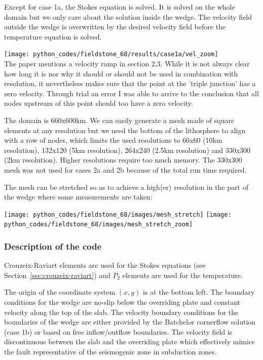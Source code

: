 Except for case 1a, the Stokes equation is solved. It is solved on the whole domain 
but we only care about the solution inside the wedge. The velocity field outside the wedge 
is overwritten by the desired velocity field before the temperature equation is solved.


\begin{center}
\texttt{[image: python\_codes/fieldstone\_68/results/case1a/vel\_zoom]}\\
{\captionfont The paper mentions a velocity ramp in section 2.3. While it is not 
always clear how long it is nor why it should or should not be used in combination
with resolution, it nevertheless makes sure that the point at the 'triple junction'
has a zero velocity. Through trial an error I was able to arrive to the conclusion that 
all nodes upstream of this point should too have a zero velocity.} 
\end{center}

The domain is 660x600km. We can easily generate a mesh made of square elements at any resolution 
but we need the bottom of the lithosphere to align with a row of nodes, which limits the 
used resolutions to 66x60 (10km resolution), 132x120 (5km resolution), 264x240 (2.5km resolution)
and 330x300 (2km resolution). Higher resolutions require too much memory. The 330x300 mesh was not 
used for cases 2a and 2b because of the total run time required.

The mesh can be stretched so as to achieve a high(er) resolution in the part of the wedge 
where some measurements are taken:
\begin{center}
\texttt{[image: python\_codes/fieldstone\_68/images/mesh\_stretch]}
\texttt{[image: python\_codes/fieldstone\_68/images/mesh\_stretch\_zoom]}
\end{center}


\subsubsection*{Description of the code}


Crouzeix-Raviart elements are used for the Stokes equations (see Section~\ref{sec:crouzeix-raviart}) 
and $P_2$ elements are used for the temperature. 

The origin of the coordinate system $(x,y)$ is at the bottom left. 
The boundary conditions for the
wedge are no-slip below the overriding plate and constant velocity along the top of the slab. 
The velocity boundary conditions for the boundaries of the wedge are either provided by the Batchelor 
cornerflow solution (case 1b) or based on free inflow/outflow boundaries. 
The velocity field is discontinuous between the slab and the overriding plate which 
effectively mimics the fault representative of the seismogenic zone in subduction zones.

